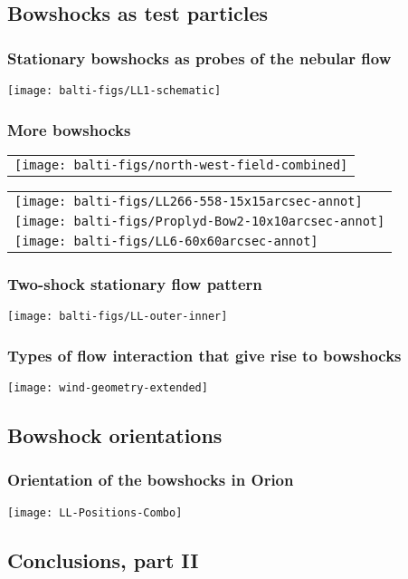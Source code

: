 \documentclass[presentation]{beamer}
\begin{document}
\subsection{Bowshocks as test particles}

\begin{frame}
  \frametitle{Stationary bowshocks as probes of the nebular flow}
  \texttt{[image: balti-figs/LL1-schematic]}
\end{frame}

\begin{frame}
  \frametitle{More bowshocks}
  \renewcommand\arraystretch{0}
  \setlength\tabcolsep{0pt}
  \begin{tabular}{l}
    \texttt{[image: balti-figs/north-west-field-combined]}\\
  \end{tabular}%
  \begin{tabular}{l}
    \texttt{[image: balti-figs/LL266-558-15x15arcsec-annot]}\\
    \texttt{[image: balti-figs/Proplyd-Bow2-10x10arcsec-annot]}\\
    \texttt{[image: balti-figs/LL6-60x60arcsec-annot]}\\
  \end{tabular}
\end{frame}

\begin{frame}
  \frametitle{Two-shock stationary flow pattern}
  \centering\texttt{[image: balti-figs/LL-outer-inner]}
\end{frame}

\begin{frame}
  \frametitle{Types of flow interaction that give rise to bowshocks}
  \centering\texttt{[image: wind-geometry-extended]}
\end{frame}

\subsection{Bowshock orientations}



\begin{frame}
  \frametitle{Orientation of the bowshocks in Orion}
  \centering
  \texttt{[image: LL-Positions-Combo]}
\end{frame}


\subsection{Conclusions, part II}
\end{document}
